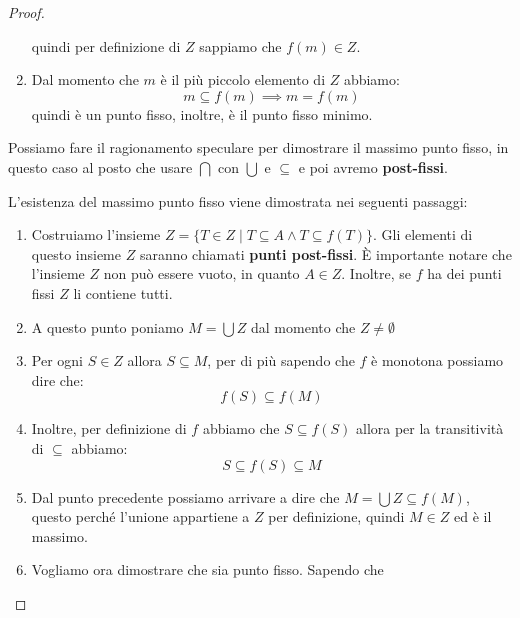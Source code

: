 \begin{teorema}
\begin{proof}
\begin{enumerate}
                  quindi per definizione di $Z$ sappiamo che $f(m)\in Z$.
            \item Dal momento che $m$ è il più piccolo elemento di $Z$ abbiamo:
                  \begin{equation}
                      m \subseteq f(m) \implies m = f(m)
                  \end{equation}
                  quindi è un punto fisso, inoltre, è il punto fisso minimo.
        \end{enumerate}
        Possiamo fare il ragionamento speculare per dimostrare il massimo punto
        fisso, in questo caso al posto che usare $\bigcap$ con $\bigcup$ e $\subseteq$
        e poi avremo \textbf{post-fissi}.

        L'esistenza del massimo punto fisso viene dimostrata nei seguenti passaggi:
        \begin{enumerate}
            \item Costruiamo l'insieme $Z = \{T\in Z \mid  T \subseteq A \land T \subseteq
                      f(T) \}$. Gli elementi di questo insieme $Z$ saranno chiamati
                  \textbf{punti post-fissi}. È importante notare che l'insieme $Z$
                  non può essere vuoto, in quanto $A \in Z$. Inoltre, se $f$ ha
                  dei punti fissi $Z$ li contiene tutti.
            \item A questo punto poniamo $M = \bigcup Z$ dal momento che $Z \neq
                      \emptyset$
            \item Per ogni $S \in Z$ allora $S\subseteq M$, per di più sapendo
                  che $f$ è monotona possiamo dire che:
                  \begin{equation}
                      f(S) \subseteq f(M)
                  \end{equation}
            \item Inoltre, per definizione di $f$ abbiamo che $S \subseteq f(S)$
                  allora per la transitività di $\subseteq$ abbiamo:
                  \begin{equation}
                      S \subseteq f(S) \subseteq M
                  \end{equation}
            \item Dal punto precedente possiamo arrivare a dire che $M = \bigcup Z \subseteq
                      f(M)$, questo perché l'unione appartiene a $Z$ per definizione,
                  quindi $M \in Z$ ed è il massimo.
            \item Vogliamo ora dimostrare che sia punto fisso. Sapendo che

\end{enumerate}
\end{proof}
\end{teorema}

